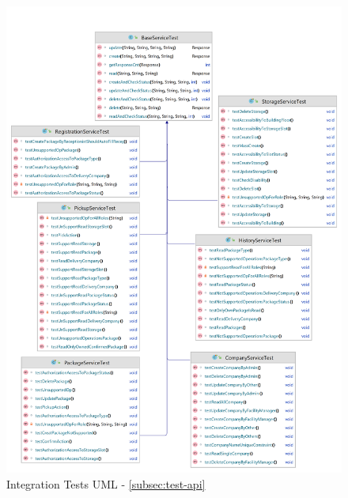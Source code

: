 \begin{figure}[!htb]
    \centering
    \includegraphics[width=1\linewidth]{images/test/api_test_white.png}
    \caption{Integration Tests UML - \autoref{subsec:test-api}}
    \label{fig:it_uml}
\end{figure}



